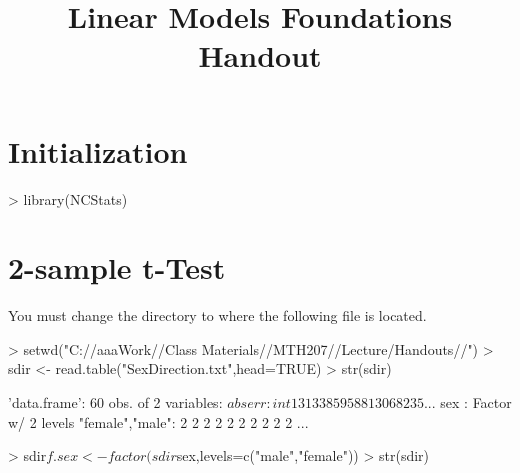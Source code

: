\documentclass[a4paper]{article}
\begin{document}
\title{Linear Models Foundations Handout}
\date{}  %
\maketitle
\vspace{-72pt}


\section{Initialization}
\begin{Schunk}
\begin{Sinput}
> library(NCStats)
\end{Sinput}
\end{Schunk}

\section{2-sample t-Test} \label{sect:sect1}
You must change the directory to where the following file is located.
\begin{Schunk}
\begin{Sinput}
> setwd("C://aaaWork//Class Materials//MTH207//Lecture/Handouts//")
> sdir <- read.table("SexDirection.txt",head=TRUE)
> str(sdir)
\end{Sinput}
\begin{Soutput}
'data.frame':	60 obs. of  2 variables:
 $ abserr: int  13 13 38 59 58 8 130 68 23 5 ...
 $ sex   : Factor w/ 2 levels "female","male": 2 2 2 2 2 2 2 2 2 2 ...
\end{Soutput}
\begin{Sinput}
> sdir$f.sex <- factor(sdir$sex,levels=c("male","female"))
> str(sdir)
\end{Sinput}
\end{Schunk}
\end{document}
